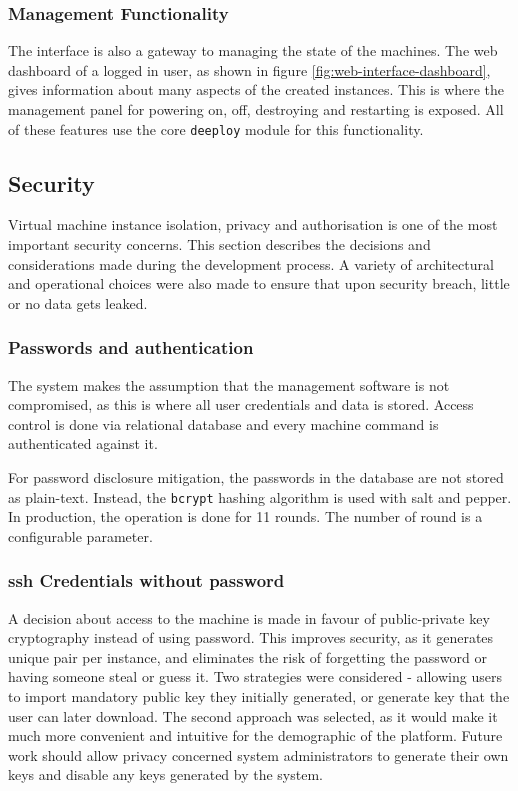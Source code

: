 \documentclass{article}
\begin{document}
\subsubsection{Management Functionality}
The interface is also a gateway to managing the state of the
machines. The web dashboard of a logged in user, as shown in figure \ref{fig:web-interface-dashboard}, gives information about many aspects of the created instances. This is where the management panel for powering on, off, destroying and restarting is exposed. All of these features use the core \texttt{deeploy} module for this functionality.

\subsection{Security}

Virtual machine instance isolation, privacy and authorisation is one of the most important security concerns. This section describes the decisions and considerations made during the development process. A variety of architectural and operational choices were also made to ensure that upon security breach, little or no data gets leaked.

\subsubsection{Passwords and authentication}
\label{Passwords and authentication}
The system makes the assumption that the management software is not compromised, as this is where all user credentials and data is stored.
Access control is done via relational database and every machine command is authenticated against it.

For password disclosure mitigation, the passwords in the database are not stored as plain-text. Instead, the \texttt{bcrypt} hashing algorithm is used with salt and pepper. In production, the operation is done for 11 rounds. The number of round is a configurable parameter.

\subsubsection{\gls{ssh} Credentials without password}
A decision about access to the machine is made in favour of public-private key cryptography instead of using password. This improves security, as it generates unique pair per instance, and eliminates the risk of forgetting the password or having someone steal or guess it.
Two strategies were considered - allowing users to import mandatory public key they initially generated, or generate key that the user can later download. The second approach was selected, as it would make it much more convenient and intuitive for the demographic of the platform. Future work should allow privacy concerned system administrators to generate their own keys and disable any keys generated by the system.
\end{document}
